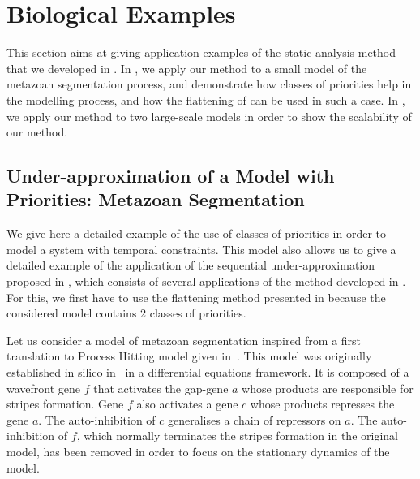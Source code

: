 
\section{Biological Examples}\label{sec:example}

This section aims at giving application examples of the static analysis method
that we developed in .
In , we apply our method to a small model of the
metazoan segmentation process,
and demonstrate how classes of priorities help in the modelling process,
and how the flattening of 
can be used in such a case.
In , we apply our method to two large-scale models
in order to show the scalability of our method.



\subsection{Under-approximation of a Model with Priorities: Metazoan Segmentation}
\label{ssec:ex-metazoan}

We give here a detailed example of the use of classes of priorities
in order to model a system with temporal constraints.
This model also allows us to give a detailed example of the application of the sequential
under-approximation proposed in ,
which consists of several applications of the method developed in
.
For this, we first have to use the flattening method presented in 
because the considered model contains 2 classes of priorities.

Let us consider a model of metazoan segmentation
inspired from a first translation to Process Hitting model given in~\cite{PMR10-TCSB}.
This model was originally established in silico in~\cite{MSB:MSB4100192}
in a differential equations framework.
It is composed of a wavefront gene $f$ that activates the gap-gene $a$ whose products are responsible for stripes formation.
Gene $f$ also activates a gene $c$ whose products represses the gene $a$.
The auto-inhibition of $c$ generalises a chain of repressors on $a$.
The auto-inhibition of $f$, which normally terminates
the stripes formation in the original model,
has been removed in order to focus on the stationary dynamics of the model.

